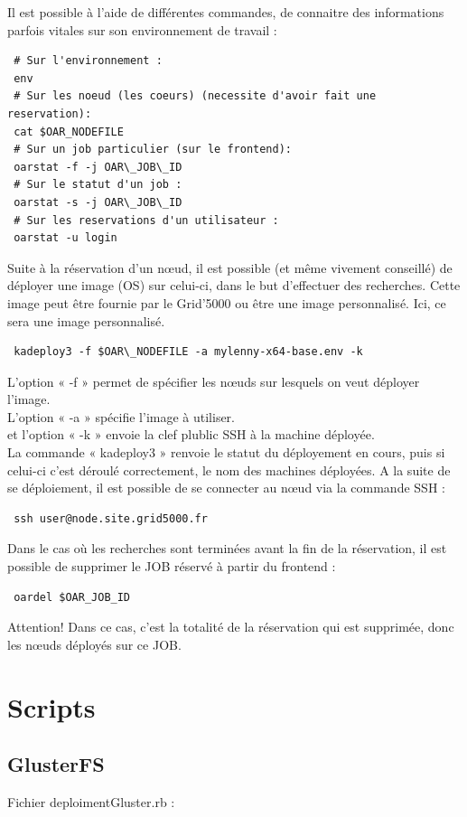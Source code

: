 \documentclass[12pt]{report}
\begin{document}
		  Il est possible à l'aide de différentes commandes, de connaitre des informations parfois vitales sur son environnement de travail :
		  \begin{lstlisting}
 # Sur l'environnement :
 env
 # Sur les noeud (les coeurs) (necessite d'avoir fait une reservation):
 cat $OAR_NODEFILE
 # Sur un job particulier (sur le frontend):
 oarstat -f -j OAR\_JOB\_ID
 # Sur le statut d'un job :
 oarstat -s -j OAR\_JOB\_ID
 # Sur les reservations d'un utilisateur :
 oarstat -u login
      \end{lstlisting}
      Suite à la réservation d'un nœud, il est possible (et même vivement conseillé) de déployer une image (OS) sur celui-ci, dans le but d'effectuer des recherches. Cette image peut être fournie par le Grid'5000 ou être une image personnalisé. Ici, ce sera une image personnalisé.
      \begin{lstlisting}
 kadeploy3 -f $OAR\_NODEFILE -a mylenny-x64-base.env -k
      \end{lstlisting}
      L'option « -f » permet de spécifier les nœuds sur lesquels on veut déployer l'image.\\
      L'option « -a » spécifie l'image à utiliser.\\
      et l'option « -k » envoie la clef plublic SSH à la machine déployée.\\
      La commande « kadeploy3 » renvoie le statut du déployement en cours, puis si celui-ci c'est déroulé correctement, le nom des machines déployées. A la suite de se déploiement, il est possible de se connecter au nœud via la commande SSH :
      \begin{lstlisting}
 ssh user@node.site.grid5000.fr
      \end{lstlisting}
      Dans le cas où les recherches sont terminées avant la fin de la réservation, il est possible de supprimer le JOB réservé à partir du frontend :
      \begin{lstlisting}
 oardel $OAR_JOB_ID
      \end{lstlisting}
      Attention! Dans ce cas, c'est la totalité de la réservation qui est supprimée, donc les nœuds déployés sur ce JOB.
      
		\chapter{Scripts}
			\section{GlusterFS}
				Fichier deploimentGluster.rb :
				
\end{document}
